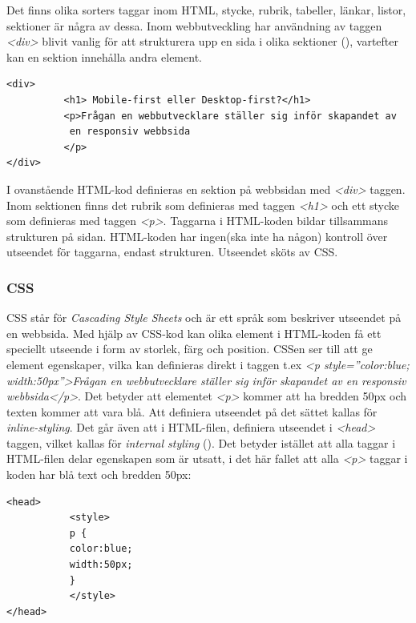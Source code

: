 \documentclass[11pt]{article}
\begin{document}
Det finns olika sorters taggar inom HTML, stycke, rubrik, tabeller, länkar, listor, sektioner är några av dessa. Inom webbutveckling har användning av taggen \textit{<div>} blivit vanlig för att strukturera upp en sida i olika sektioner (\cite{divtable}), vartefter kan en sektion innehålla andra element.

\vspace{0.3cm}
\begin{verbatim}
<div> 
          <h1> Mobile-first eller Desktop-first?</h1>
          <p>Frågan en webbutvecklare ställer sig inför skapandet av
           en responsiv webbsida
          </p>
</div>
\end{verbatim}
\vspace{0.3cm}

I ovanstående HTML-kod definieras en sektion på webbsidan med \textit{<div>} taggen. Inom sektionen finns det rubrik som definieras med taggen \textit{<h1>} och ett stycke som definieras med taggen \textit{<p>}. Taggarna i HTML-koden bildar tillsammans strukturen på sidan. HTML-koden har ingen(ska inte ha någon) kontroll över utseendet för taggarna, endast strukturen. Utseendet sköts av CSS.

\subsubsection{CSS}
CSS står för \textit{Cascading Style Sheets} och är ett språk som beskriver utseendet på en webbsida.
Med hjälp av CSS-kod kan olika element i HTML-koden få ett speciellt utseende i form av storlek, färg och position. CSSen ser till att ge element egenskaper, vilka kan definieras direkt i taggen t.ex \textit{<p style=”color:blue; width:50px”>Frågan en webbutvecklare ställer sig inför skapandet av en responsiv webbsida</p>}. Det betyder att elementet \textit{<p>} kommer att ha bredden 50px och texten kommer att vara blå. Att definiera utseendet på det sättet kallas för \textit{inline-styling}. Det går även att i HTML-filen, definiera utseendet i \textit{<head>} taggen, vilket kallas för \textit{internal styling} (\cite{css}). Det betyder istället att alla taggar i HTML-filen delar egenskapen som är utsatt, i det här fallet att alla \textit{<p>} taggar i koden har blå text och bredden 50px:

\vspace{0.3cm}
\begin{verbatim}
<head>
           <style>
           p {
           color:blue;
           width:50px;
           }
           </style>
</head>
\end{verbatim}
\vspace{0.3cm}
\end{document}

